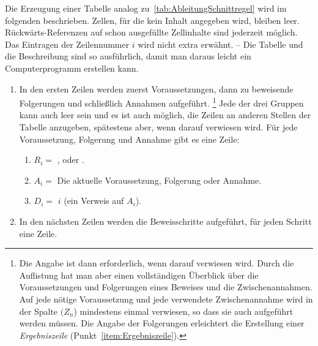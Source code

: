 Die Erzeugung einer Tabelle analog zu~\vref{tab:AbleitungSchnittregel} wird im folgenden beschrieben.
Zellen, für die kein Inhalt angegeben wird, bleiben leer.
Rückwärts-Referenzen auf schon ausgefüllte Zellinhalte sind jederzeit möglich.
Das Eintragen der Zeilennummer $i$ wird nicht extra erwähnt.
-- Die Tabelle und die Beschreibung sind so ausführlich, damit man daraus leicht ein Computerprogramm erstellen kann.

\begin{enumerate}
	\item In den ersten Zeilen werden zuerst Voraussetzungen, dann zu beweisende Folgerungen und schließlich Annahmen aufgeführt.%
	\footnote{%
		Die Angabe ist dann erforderlich, wenn darauf verwiesen wird.
		Durch die Auflistung hat man aber einen vollständigen Überblick über die Voraussetzungen und Folgerungen eines Beweises und die Zwischenannahmen.
		Auf jede nötige Voraussetzung und jede verwendete Zwischenannahme wird in der Spalte $(Z_n$) mindestens einmal verwiesen, so dass sie auch aufgeführt werden müssen.
		Die Angabe der Folgerungen erleichtert die Erstellung einer \emph{Ergebniszeile} (\seename Punkt~\ref{item:Ergebniszeile}).
	}
	Jede der drei Gruppen kann auch leer sein und es ist auch möglich, die Zeilen an anderen Stellen der Tabelle anzugeben, spätestens aber, wenn darauf verwiesen wird.
	Für jede Voraussetzung, Folgerung und Annahme gibt es eine Zeile:
	\begin{enumerate}
		\item $R_i =$ ,  oder .
		\item $A_i =$ Die aktuelle Voraussetzung, Folgerung oder Annahme.
		\item $D_i =$ $i$ \quad (ein Verweis auf $A_i$).
	\end{enumerate}
	\item In den nächsten Zeilen werden die Beweisschritte aufgeführt, für jeden Schritt eine Zeile.
	

\end{enumerate}
